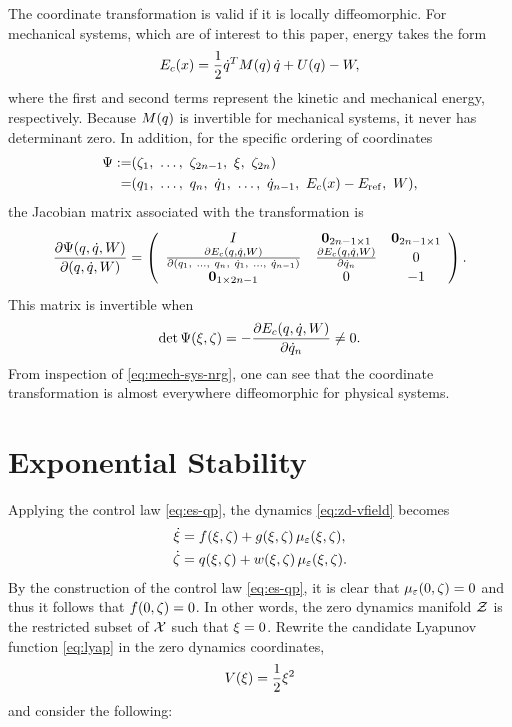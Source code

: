 %
The coordinate transformation is valid if it is locally diffeomorphic.
%
For mechanical systems, which are of interest to this paper, energy takes the
form
%
\begin{align}
  \label{eq:mech-sys-nrg}
  E_{c}(x) = \frac{1}{2} \dot{q}^{T} M(q) \, \dot{q} + U(q) - W,
\end{align}
%
where the first and second terms represent the kinetic and mechanical energy,
respectively.
%
Because $M(q)$ is invertible for mechanical systems, it never has determinant
zero.
%
In addition, for the specific ordering of coordinates
\begin{align*}
  \Psi :=& (\zdz_{1}, \ \ldots, \ \zdz_{2n-1}, \ \zdx, \ \zdz_{2n})\\
  =& (\q_{1}, \ \ldots, \ \q_{n}, \ \dq_{1}, \ \ldots, \ \dq_{n-1}, \ \Ec\arx -
  \Eref, \ \W),
\end{align*}
the Jacobian matrix
associated with the transformation is
\begin{align*}
  \frac{\partial{\Psi(q, \dot{q}, W)}}{\partial{(q, \dot{q}, W)}} =
  \left(\begin{array}{c c c}
    I & {\mathbf 0}_{2n-1 \times 1} & {\mathbf 0}_{2n-1 \times 1}\\
    \frac{\partial{E_{c}(q, \dot{q}, W)}}{\partial{(q_{1}, \ \ldots, \ q_{n}, \ \dot{q}_{1}, \ \ldots, \ \dot{q}_{n-1})}} & \frac{\partial{E_{c}(q, \dot{q}, W)}}{\partial{\dot{q}_{n}}} & 0\\
    {\mathbf 0}_{1 \times 2n-1} & 0 & -1
  \end{array}\right).
\end{align*}
%
This matrix is invertible when
\begin{align*}
  \det \Psi(\xi, \zeta) = -\frac{\partial{E_{c}(q, \dot{q}, W)}}{\partial{\dot{q}_{n}}} \neq 0.
\end{align*}
From inspection of \eqref{eq:mech-sys-nrg}, one can see that the coordinate
transformation is almost everywhere diffeomorphic for physical systems.

\section{Exponential Stability}

Applying the control law \eqref{eq:es-qp}, the dynamics \eqref{eq:zd-vfield}
becomes
\begin{align}
  \nonumber
  \dot {\xi} &= f(\xi, \zeta) + g(\xi, \zeta) \, \mu_{\varepsilon}(\xi, \zeta),\\
  \dot {\zeta} &= q(\xi, \zeta) + w(\xi, \zeta) \, \mu_{\varepsilon}(\xi, \zeta).
  \label{eq:zd-vfield-cl}
\end{align}
%
By the construction of the control law \eqref{eq:es-qp}, it is clear that
$\mu_{\varepsilon}(0, \zeta) = 0$ and thus it follows that $f(0, \zeta) = 0$.
%
In other words, the zero dynamics manifold $\mathcal{Z}$ is the restricted
subset of $\mathcal{X}$ such that $\xi = 0$.
%
Rewrite the candidate Lyapunov function \eqref{eq:lyap} in the zero dynamics
coordinates,
%
\begin{align*}
  V(\xi) = \frac{1}{2} \xi^{2}
\end{align*}
and consider the following:\vgap

